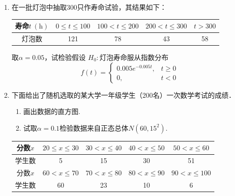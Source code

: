 \begin{enumerate}
    \item 在一批灯泡中抽取300只作寿命试验，其结果如下：
    \renewcommand{\arraystretch}{1.3}
    \begin{table}[H]\centering
        \begin{tabular}{c|cccc}
        寿命$t\ (\mathrm{h})$ & $0\leq t\leq 100$ & $100<t\leq 200$ & $200<t\leq 300$ & $t>300$ \\ \hline
        灯泡数              & 121               & 78              & 43              & 58     
        \end{tabular}
    \end{table}
    \renewcommand{\arraystretch}{1.0}
    取$\alpha=0.05$，试检验假设
    $H_0:$灯泡寿命服从指数分布
    $$f(t)=\left\{\begin{array}{ll}
        0.005e^{-0.005t}, & t\geq 0 \\
        0, & t<0
    \end{array}\right.$$



    \item 下面给出了随机选取的某大学一年级学生（200名）一次数学考试的成绩．
    \begin{enumerate}
        \item 画出数据的直方图.
        \item 试取$\alpha=0.1$检验数据来自正态总体$N(60,15^2)$.
    \end{enumerate}
    \renewcommand{\arraystretch}{1.3}
    \begin{table}[H]\centering
        \begin{tabular}{c|cccc}
        \hline
        分数$x$ & $20\leq x\leq 30$ & $30<x\leq 40$ & $40<x\leq 50$ & $50<x\leq 60$  \\ \hline
        学生数   & 5                 & 15            & 30            & 51             \\ \hline
        分数$x$ & $60<x\leq 70$     & $70<x\leq 80$ & $80<x\leq 90$ & $90<x\leq 100$ \\ \hline
        学生数   & 60                & 23            & 10            & 6              \\ \hline
        \end{tabular}
    \end{table}
    \renewcommand{\arraystretch}{1.0}






\end{enumerate}
